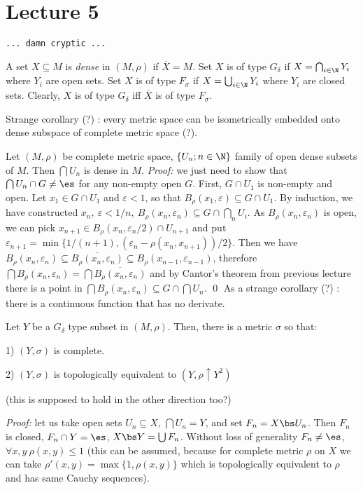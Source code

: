 \chapter{Lecture 5}
\centerline{\tt ... damn cryptic ...}

 A set $X\subseteq M$ is {\it dense} in $(M,\rho)$ if $
\overline X = M$. Set $X$ is of type $G_\delta$ if $X=\bigcap
_{i\in \N} Y_i$ where $Y_i$ are open sets. Set $X$ is of type $F_\sigma$ 
if $X=\bigcup_{i\in \N} Y_i$ where $Y_i$ are closed sets. Clearly, 
$X$ is of type $G_\delta$ iff $\overline X$ is of type $F_\sigma$.

\smallskip Strange corollary (?) : every metric space can be isometrically 
embedded onto dense subspace of complete metric space (?).

\medskip

 Let $(M,\rho)$ be complete metric space, $\{U_n; n\in 
\N\}$ family of open dense subsets of $M$. Then $\bigcap U_n$ is dense 
in $M$.
\smallskip
{\it Proof:} we just need to show that $\bigcap U_n \cap G \neq \es$ 
for any non-empty open $G$. First, $G\cap U_1$ is non-empty and open.
Let $x_1\in G\cap U_1$ and $\varepsilon < 1$, so that $B_\rho (x_1,
\varepsilon) \subseteq G\cap U_1$. By induction, we have constructed 
$x_n,\ \varepsilon < 1/n,\ B_\rho(x_n,\varepsilon_n)\subseteq G\cap 
\bigcap_n U_i$. As $B_\rho(x_n,\varepsilon_n)$ is open, we can pick
$x_{n+1}\in B_\rho(x_n,\varepsilon_n/2)\cap U_{n+1}$ and put $\varepsilon_
{n+1} = \min\{1/(n+1),(\varepsilon_n - \rho(x_n,x_{n+1}))/2\}$. Then we 
have $B_\rho(x_n, \varepsilon_n)\subseteq \overline{B_\rho(x_n,\varepsilon_n)}
\subseteq B_\rho(x_{n-1},\varepsilon_{n-1})$, therefore $\bigcap B_\rho
(x_n,\varepsilon_n) = \bigcap \overline{B_\rho(x_n,\varepsilon_n)}$ and 
by Cantor's theorem from previous lecture there is a point in $\bigcap 
B_\rho(x_n,\varepsilon_n) \subseteq G\cap \bigcap U_n$.
\qed \smallskip
As a strange corollary (?) : there is a continuous function that has no 
derivate.

\medskip

Let $Y$ be a $G_\delta$ type subset in $(M,\rho)$. Then, there is a 
metric $\sigma$ so that:
{\parindent0.5in\parskip6pt
	\item{1)} $(Y,\sigma)$ is complete.
	\item{2)} $(Y,\sigma)$ is topologically equivalent to $(Y,\rho\uparrow
		Y^2)$

}

(this is supposed to hold in the other direction too?)

{\it Proof:} let us take open sets $U_n\subseteq X$, $\bigcap U_n = Y$, and 
set $F_n = X\bs U_n$. Then $F_n$ is closed, $F_n\cap Y = \es$, $X\bs Y = 
\bigcup F_n$. Without loss of generality $F_n \neq \es$, $\forall x,y\ 
\rho(x,y) \leq 1$ (this can be assumed, because for complete metric $\rho$ 
on $X$ we can take $\rho'(x,y) = \max\{1,\rho(x,y)\}$ which is topologically 
equivalent to $\rho$ and has same Cauchy sequences).

